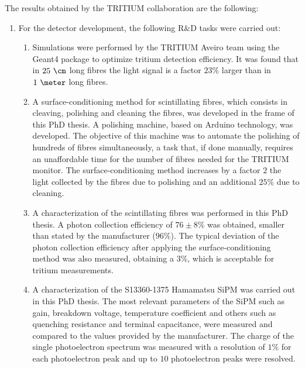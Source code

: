 The results obtained by the TRITIUM collaboration are the following:

\begin{enumerate}
\item{} For the detector development, the following R$\&$D tasks were carried out:

\begin{enumerate}
\item{} Simulations were performed by the TRITIUM Aveiro team using the Geant4 package to optimize tritium detection efficiency. It was found that in $25~\cm$ long fibres the light signal is a factor $23\%$ larger than in $1~\meter$ long fibres. %

\item{} A surface-conditioning method for scintillating fibres, which consists in cleaving, polishing and cleaning the fibres, was developed in the frame of this PhD thesis. A polishing machine, based on Arduino technology, was developed. The objective of this machine was to automate the polishing of hundreds of fibres simultaneously, a task that, if done manually, requires an unaffordable time for the number of fibres needed for the TRITIUM monitor. The surface-conditioning method increases by a factor $2$ the light collected by the fibres due to polishing and an additional $25\%$ due to cleaning. 

\item{} A characterization of the scintillating fibres was performed in this PhD thesis. A photon collection efficiency of $76\pm 8\%$ was obtained, smaller than stated by the manufacturer ($96\%$). The typical deviation of the photon collection efficiency after applying the surface-conditioning method was also measured, obtaining a $3\%$, which is acceptable for tritium measurements.

\item{} A characterization of the S13360-1375 Hamamatsu SiPM was carried out in this PhD thesis. The most relevant parameters of the SiPM such as gain, breakdown voltage, temperature coefficient and others such as quenching resistance and terminal capacitance, were measured and compared to the values provided by the manufacturer. The charge of the single photoelectron spectrum was measured with a resolution of $1\%$ for each photoelectron peak and up to $10$ photoelectron peaks were resolved. %


\end{enumerate}
\end{enumerate}
